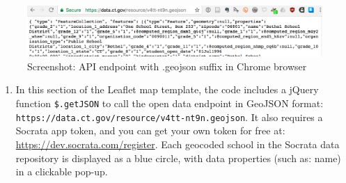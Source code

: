 \documentclass[
  english,
]{book}
\providecommand{\tightlist}{%
  \setlength{\itemsep}{0pt}\setlength{\parskip}{0pt}}
\begin{document}
\begin{figure}
\centering
\includegraphics{images/13-leaflet/ct-open-data-geojson.png}
\caption{Screenshot: API endpoint with .geojson suffix in Chrome browser}
\end{figure}

\begin{enumerate}
\def\labelenumi{\arabic{enumi})}
\setcounter{enumi}{4}
\tightlist
\item
  In this section of the Leaflet map template, the code includes a jQuery function \texttt{\$.getJSON} to call the open data endpoint in GeoJSON format: \texttt{https://data.ct.gov/resource/v4tt-nt9n.geojson}. It also requires a Socrata app token, and you can get your own token for free at: \url{https://dev.socrata.com/register}. Each geocoded school in the Socrata data repository is displayed as a blue circle, with data properties (such as: name) in a clickable pop-up.
\end{enumerate}
\end{document}
